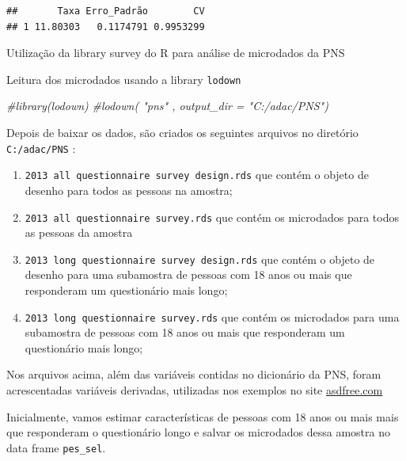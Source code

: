 \documentclass[]{book}
\newenvironment{Shaded}{\begin{snugshade}}{\end{snugshade}}
\newcommand{\CommentTok}[1]{\textcolor[rgb]{0.56,0.35,0.01}{\textit{#1}}}
\theoremstyle{definition}
\theoremstyle{definition}
\theoremstyle{definition}
\theoremstyle{remark}
\let\BeginKnitrBlock\begin \let\EndKnitrBlock\end
\begin{document}
\begin{verbatim}
##       Taxa Erro_Padrão        CV
## 1 11.80303   0.1174791 0.9953299
\end{verbatim}

\BeginKnitrBlock{example}
\protect\hypertarget{exm:exe15}{}{\label{exm:exe15} }Utilização da library
survey do R para análise de microdados da PNS
\EndKnitrBlock{example}

Leitura dos microdados usando a library \texttt{lodown}\citep{R-lodown}

\begin{Shaded}
\begin{Highlighting}[]
\CommentTok{#library(lodown)}
\CommentTok{#lodown( "pns" , output_dir = "C:/adac/PNS")}
\end{Highlighting}
\end{Shaded}

Depois de baixar os dados, são criados os seguintes arquivos no
diretório \texttt{C:/adac/PNS} :

\begin{enumerate}
\def\labelenumi{\arabic{enumi}.}
\item
  \texttt{2013\ all\ questionnaire\ survey\ design.rds} que contém o
  objeto de desenho para todos as pessoas na amostra;
\item
  \texttt{2013\ all\ questionnaire\ survey.rds} que contém os microdados
  para todos as pessoas da amostra
\item
  \texttt{2013\ long\ questionnaire\ survey\ design.rds} que contém o
  objeto de desenho para uma subamostra de pessoas com 18 anos ou mais
  que responderam um questionário mais longo;
\item
  \texttt{2013\ long\ questionnaire\ survey.rds} que contém os
  microdados para uma subamostra de pessoas com 18 anos ou mais que
  responderam um questionário mais longo;
\end{enumerate}

\BeginKnitrBlock{remark}
{}Nos arquivos acima, além das variáveis
contidas no dicionário da PNS, foram acrescentadas variáveis derivadas,
utilizadas nos exemplos no site
\href{https://github.com/ajdamico/asdfree/tree/master/Pesquisa\%20Nacional\%20De\%20Saude}{asdfree.com}
\EndKnitrBlock{remark}

Inicialmente, vamos estimar características de pessoas com 18 anos ou
mais mais que responderam o questionário longo e salvar os microdados
dessa amostra no data frame \texttt{pes\_sel}.
\end{document}
